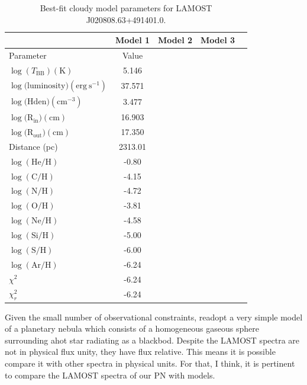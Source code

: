 \documentclass[fleqn,usenatbib]{mnras}
\begin{document}
{%
\begin{table}
	\centering
	\caption{Best-fit {\sc cloudy} model parameters for LAMOST J020808.63+491401.0.}
	\label{tab:example_table}
	\begin{tabular}{lcccc} %
                \hline
                & Model 1 &  Model 2 &  Model 3\\  
		\hline
		Parameter & Value \\
                \hline
		$\log(T_{\mathrm{BB}}) (\mathrm{K})$  & 5.146 \\
		$\log(\mathrm{luminosity) (erg~s^{-1})}$ & 37.571 \\
		  $\log(\mathrm{Hden) (cm^{-3})} $ & 3.477 \\
                  $\log(\mathrm{R_{in}) (cm)}$ & 16.903 \\
                $\log(\mathrm{R_{out}) (cm)}$ & 17.350 \\
                 Distance (pc) & 2313.01 \\
                  $\log(\mathrm{He/H})$ & -0.80 \\
                $\log(\mathrm{C/H})$ & -4.15 \\
                $\log(\mathrm{N/H})$ & -4.72 \\
                $\log(\mathrm{O/H})$ & -3.81 \\
                $\log(\mathrm{Ne/H})$ & -4.58 \\
                $\log(\mathrm{Si/H})$ & -5.00 \\
                $\log(\mathrm{S/H})$ & -6.00 \\
                $\log(\mathrm{Ar/H})$ & -6.24 \\
                 \hline
                 $\chi^2$ & -6.24 \\
                 $\chi^2_r$ & -6.24 \\
                 
                \hline
	\end{tabular}
\end{table}

Given the small number of observational constraints, readopt a very simple model of a planetary nebula which
consists of a homogeneous gaseous sphere surrounding ahot star radiating as a blackbod.
Despite the LAMOST spectra are not in physical flux unity, they have flux relative. This means it
is possible compare it with other spectra in physical units. For that, I think, it is pertinent to
compare the LAMOST spectra of our PN with models.

}
\end{document}
